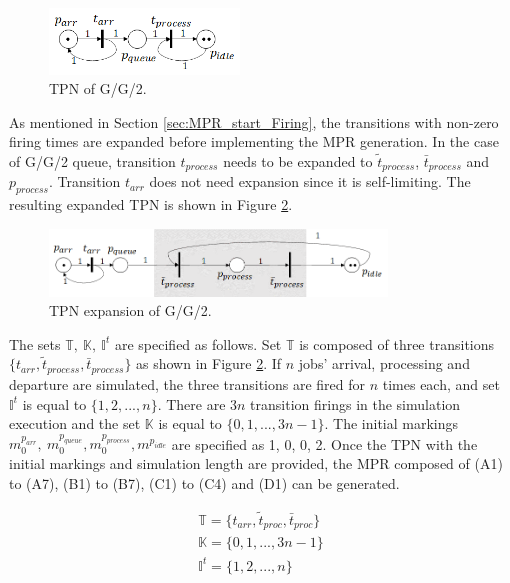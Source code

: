 \documentclass[suppldata]{interact}
\theoremstyle{plain}
\theoremstyle{definition}
\theoremstyle{remark}
\begin{document}
\begin{figure}[h]
	\centering
	\includegraphics[width=0.45\textwidth]{Figures/TPN-GG2.png}
	\caption{TPN of G/G/2.}
	\label{fig:tpn_GG2}
\end{figure}

As mentioned in Section \ref{sec:MPR_start_Firing}, the transitions with non-zero firing times are expanded before implementing the MPR generation. In the case of G/G/2 queue, transition $t_{process}$ needs to be expanded to $\tilde{t}_{process}$, $\bar{t}_{process}$ and $p_{process}$. Transition $t_{arr}$ does not need expansion since it is self-limiting. The resulting expanded TPN is shown in Figure \ref{fig:tpn_GG2_expansion}.  

\begin{figure}[h]
	\centering
	\includegraphics[width=0.8\textwidth]{Figures/TPN-GG2-expansion.png}
	\caption{TPN expansion of G/G/2.}
	\label{fig:tpn_GG2_expansion}
\end{figure}

The sets $\mathbb{T},\ \mathbb{K},\ \mathbb{I}^t$ are specified as follows. Set $\mathbb{T}$ is composed of three transitions $\{t_{arr},\tilde{t}_{process}, \bar{t}_{process}\}$ as shown in Figure \ref{fig:tpn_GG2_expansion}. If $n$ jobs' arrival, processing and departure are simulated, the three transitions are fired for $n$ times each, and set $\mathbb{I}^t$ is equal to $\{1,2,..., n\}$. There are $3n$ transition firings in the simulation execution and the set $\mathbb{K}$ is equal to $\{0,1,..., 3n-1\}$. The initial markings $m^{p_{arr}}_0,\ m^{p_{queue}}_0, m^{p_{process}}_0, m^{p_{idle}}$ are specified as 1, 0, 0, 2. Once the TPN with the initial markings and simulation length are provided, the MPR composed of (A1) to (A7), (B1) to (B7), (C1) to (C4) and (D1) can be generated. 

\begin{eqnarray}
	\mathbb{T} = \{t_{arr},\tilde{t}_{proc}, \bar{t}_{proc}\} \nonumber\\
	\mathbb{K} = \{0,1,..., 3n-1\} \nonumber\\
	\mathbb{I}^t=\{1,2,..., n\} \nonumber
\end{eqnarray}
\end{document}
